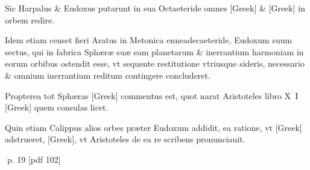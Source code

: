 \begin{parnumbers}
Sic Harpalus \& Eudoxus putarunt in sua Octaeteride omnes \textgreek{[Greek]} \& \textgreek{[Greek]} in orbem redire.

Idem etiam censet fieri Aratus in Metonica enneadecaeteride, Eudoxum suum sectus, qui in fabrica Sphæræ suæ eam planetarum \& inerrantium harmoniam in eorum orbibus ostendit esse, vt sequente  restitutione vtriusque sideris, necessario \& omnium inerrantium reditum contingere concluderet.

Propterea tot Sphæras \textgreek{[Greek]} commentus est, quot narat Aristoteles libro X I \textgreek{[Greek]} quem consulas licet.

Quin etiam Calippus alios orbes præter Eudoxum addidit, ea ratione, vt \textgreek{[Greek]} adstrueret, \textgreek{[Greek]}, vt Aristoteles de ea re scribens pronunciauit.

\end{parnumbers}
\clearpage
p. 19 [pdf 102]

